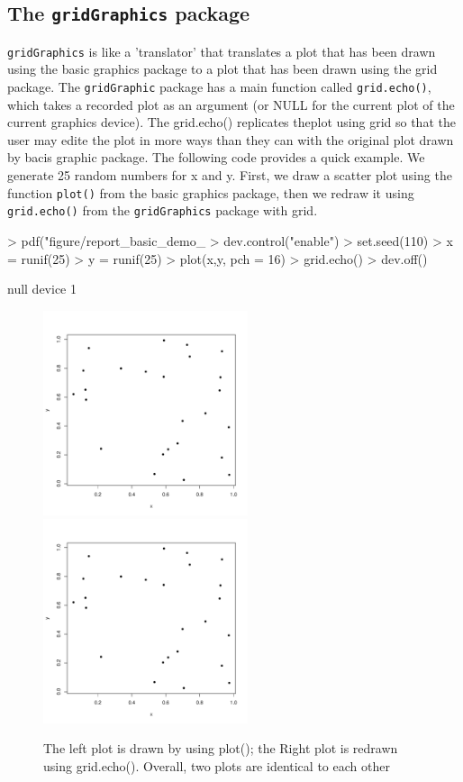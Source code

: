 \documentclass[a4paper,10pt]{article}
\begin{document}
\subsection{The \texttt{gridGraphics} package}
\texttt{gridGraphics} is like a 'translator' that translates a plot that has been drawn using the basic graphics package to a plot that has been drawn using the grid package. 
The \texttt{gridGraphic} package has a main function called \texttt{grid.echo()}, which takes a recorded plot as an argument (or NULL for the current plot of the current graphics device). The grid.echo() replicates theplot using grid so that the user may edite the plot in more ways than they can with the original plot drawn by bacis graphic package.
The following code provides a quick example. We generate 25 random numbers for x and y. First, we draw a scatter plot using the function \texttt{plot()} from the basic graphics package, then we redraw it using \texttt{grid.echo()} from the \texttt{gridGraphics} package with grid.
\begin{Schunk}
\begin{Sinput}
> pdf("figure/report_basic_demo_%
> dev.control("enable")
> set.seed(110)
> x = runif(25)
> y = runif(25)
> plot(x,y, pch = 16)
> grid.echo()
> dev.off()
\end{Sinput}
\begin{Soutput}
null device 
          1 
\end{Soutput}
\end{Schunk}
\begin{figure}[h]
\begin{center}
  \includegraphics[height = 6cm, width = 6cm]{figure/report_basic_demo_1.pdf}
  \includegraphics[height = 6cm, width = 6cm]{figure/report_basic_demo_1.pdf}
  \caption{The left plot is drawn by using plot(); the Right plot is redrawn using grid.echo(). Overall, two plots are identical to each other}
  	\label{figure1}
\end{center}
\end{figure}
\end{document}
